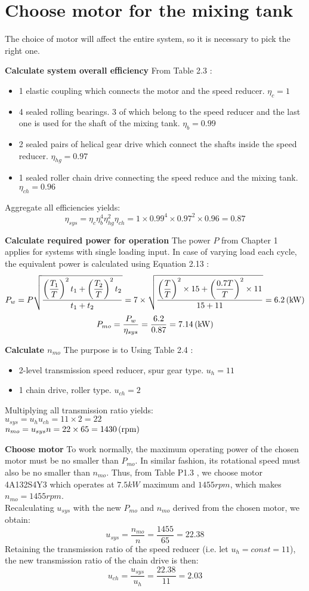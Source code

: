 \section{Choose motor for the mixing tank}
The choice of motor will affect the entire system, so it is necessary to pick the right one.

\textbf{Calculate system overall efficiency} From Table 2.3 \cite{tk1}:
\begin{itemize}
	\item 1 elastic coupling which connects the motor and the speed reducer. $ \eta_c = 1 $
	\item 4 sealed rolling bearings. 3 of which belong to the speed reducer and the last one is used for the shaft of the mixing tank. $ \eta_b = 0.99 $
	\item 2 sealed pairs of helical gear drive which connect the shafts inside the speed reducer. $ \eta_{hg} = 0.97 $
	\item 1 sealed roller chain drive connecting the speed reduce and the mixing tank. $ \eta_{ch} = 0.96 $
\end{itemize}
Aggregate all efficiencies yields: 
\[\eta_{sys} = \eta_c\eta_b^4\eta_{hg}^2\eta_{ch} = 1 \times 0.99^4 \times 0.97^2 \times 0.96 = 0.87\]

\textbf{Calculate required power for operation}
The power $ P $ from Chapter 1 applies for systems with single loading input. In case of varying load each cycle, the equivalent power is calculated using  Equation 2.13 \cite{tk1}:
\[
P_w = P\sqrt{\dfrac{\left(\dfrac{T_1}{T}\right)^2t_1 + \left(\dfrac{T_2}{T}\right)^2t_2}{t_1+t_2}} = 7 \times \sqrt{\dfrac{\left(\dfrac{T}{T}\right)^2\times15 + \left(\dfrac{0.7T}{T}\right)^2\times11}{15+11}} = 6.2 \, (\mathrm{kW})
\]
\[
P_{mo} = \dfrac{P_w}{\eta_{sys}} = \dfrac{6.2}{0.87} = 7.14 \, (\mathrm{kW})
\]

\textbf{Calculate $ n_{mo} $} The purpose is to Using Table 2.4 \cite{tk1}:
\begin{itemize}
	\item 2-level transmission speed reducer, spur gear type. $ u_{h} = 11 $
	\item 1 chain drive, roller type. $ u_{ch} = 2$
\end{itemize}
Multiplying all transmission ratio yields:\\
$ u_{sys} = u_{h}u_{ch} = 11 \times 2 = 22 $\\
$ n_{mo} = u_{sys}n = 22 \times 65 = 1430 \, (\mathrm{rpm}) $

\textbf{Choose motor}
To work normally, the maximum operating power of the chosen motor must be no smaller than $ P_{mo} $. In similar fashion, its rotational speed must also be no smaller than  $ n_{mo} $. Thus, from Table P1.3 \cite{tk1}, we choose motor 4A132S4Y3 which operates at $ 7.5 \unit{kW} $ maximum and $ 1455 \unit{rpm} $, which makes $ n_{mo} = 1455\unit{rpm}$.\\
Recalculating $ u_{sys} $ with the new $ P_{mo} $ and $ n_{mo} $ derived from the chosen motor, we obtain:
\[u_{sys} = \dfrac{n_{mo}}{n} = \dfrac{1455}{65} = 22.38\]
Retaining the transmission ratio of the speed reducer (i.e. let $ u_{h} = const = 11 $), the new transmission ratio of the chain drive is then:
\[u_{ch} = \dfrac{u_{sys}}{u_{h}} = \dfrac{22.38}{11} = 2.03\]

